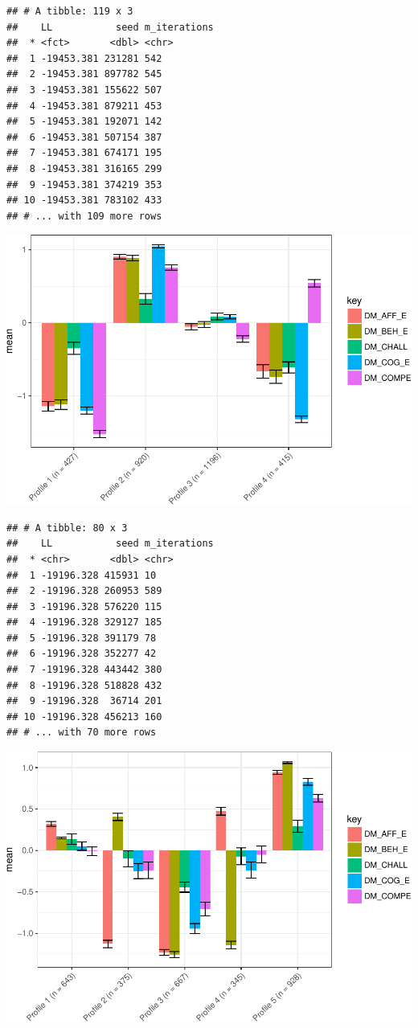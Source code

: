 \documentclass[]{book}
\theoremstyle{definition}
\theoremstyle{definition}
\theoremstyle{definition}
\theoremstyle{remark}
\begin{document}
\begin{verbatim}
## # A tibble: 119 x 3
##    LL           seed m_iterations
##  * <fct>       <dbl> <chr>       
##  1 -19453.381 231281 542         
##  2 -19453.381 897782 545         
##  3 -19453.381 155622 507         
##  4 -19453.381 879211 453         
##  5 -19453.381 192071 142         
##  6 -19453.381 507154 387         
##  7 -19453.381 674171 195         
##  8 -19453.381 316165 299         
##  9 -19453.381 374219 353         
## 10 -19453.381 783102 433         
## # ... with 109 more rows
\end{verbatim}

\includegraphics{rosenberg-dissertation_files/figure-latex/spec-solutions-model1-2.pdf}

\begin{verbatim}
## # A tibble: 80 x 3
##    LL           seed m_iterations
##  * <chr>       <dbl> <chr>       
##  1 -19196.328 415931 10          
##  2 -19196.328 260953 589         
##  3 -19196.328 576220 115         
##  4 -19196.328 329127 185         
##  5 -19196.328 391179 78          
##  6 -19196.328 352277 42          
##  7 -19196.328 443442 380         
##  8 -19196.328 518828 432         
##  9 -19196.328  36714 201         
## 10 -19196.328 456213 160         
## # ... with 70 more rows
\end{verbatim}

\includegraphics{rosenberg-dissertation_files/figure-latex/spec-solutions-model1-3.pdf}
\end{document}
